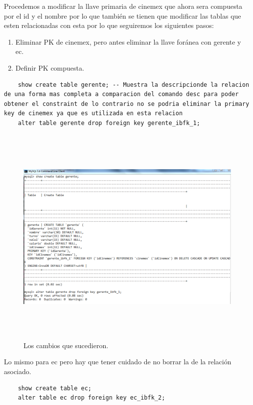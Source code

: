 \documentclass[12pt, titlepage]{article}
\begin{document}
    Procedemos a modificar la llave primaria de cinemex que ahora sera compuesta por el id y el nombre por lo que también se tienen que modificar las tablas que esten relacionadas con esta por lo que seguiremos los siguientes pasos:
    \begin{enumerate}  
        \item Eliminar PK de cinemex, pero antes eliminar la llave foránea con gerente y ec. 
        \item Definir PK compuesta.
    \end{enumerate}
    \begin{lstlisting}
    show create table gerente; -- Muestra la descripcionde la relacion de una forma mas completa a comparacion del comando desc para poder obtener el constraint de lo contrario no se podria eliminar la primary key de cinemex ya que es utilizada en esta relacion
    alter table gerente drop foreign key gerente_ibfk_1;
    \end{lstlisting}
    \begin{figure}[H]
        \begin{center}
            \includegraphics[width=15cm, height=11cm]{img/drop-fk.png}
            \caption{Los cambios que sucedieron.}
            \label{fig:drop-fk}
        \end{center}
    \end{figure}
    Lo mismo para ec pero hay que tener cuidado de no borrar la de la relación asociado. 
    \begin{lstlisting}
    show create table ec;
    alter table ec drop foreign key ec_ibfk_2;
    \end{lstlisting}
\end{document}
